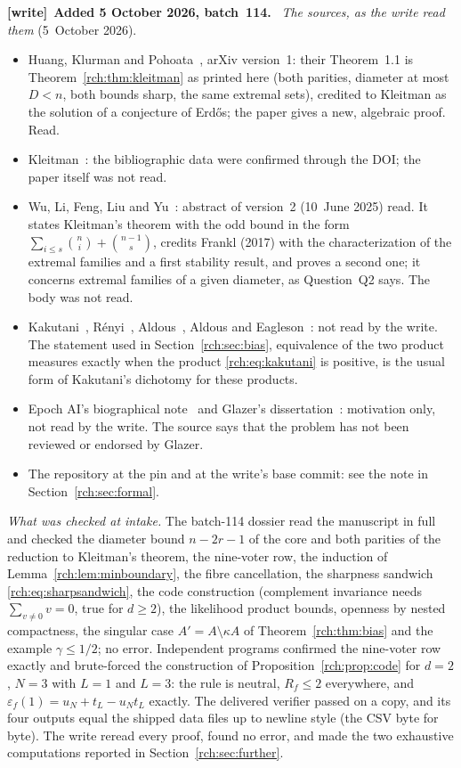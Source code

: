 \documentclass[11pt]{article}
\theoremstyle{definition}
\theoremstyle{remark}
\newcommand{\eps}{\varepsilon}
\newenvironment{writenote}[1][]{\par\smallskip\begingroup\small
 \noindent\textbf{[write]}\if\relax\detokenize{#1}\relax\else~\textbf{#1.}\fi\ }%
 {\par\endgroup\smallskip}
\begin{document}
\begin{writenote}[Added 5 October 2026, batch~114]
\emph{The sources, as the write read them} (5~October 2026).
\begin{itemize}\raggedright
\item Huang, Klurman and Pohoata~\cite{HKP}, arXiv version~1: their
 Theorem~1.1 is Theorem~\ref{rch:thm:kleitman} as printed here (both
 parities, diameter at most $D<n$, both bounds sharp, the same extremal
 sets), credited to Kleitman as the solution of a conjecture of Erd\H{o}s;
 the paper gives a new, algebraic proof. Read.
\item Kleitman~\cite{Kleitman}: the bibliographic data were confirmed through
 the DOI; the paper itself was not read.
\item Wu, Li, Feng, Liu and Yu~\cite{WuEtAl}: abstract of version~2 (10~June
 2025) read. It states Kleitman's theorem with the odd bound in the form
 $\sum_{i\le s}\binom ni+\binom{n-1}s$, credits Frankl (2017) with the
 characterization of the extremal families and a first stability result,
 and proves a second one; it concerns extremal families of a given
 diameter, as Question~Q2 says. The body was not read.
\item Kakutani~\cite{Kakutani}, R\'enyi~\cite{Renyi}, Aldous~\cite{Aldous},
 Aldous and Eagleson~\cite{AldousEagleson}: not read by the write. The
 statement used in Section~\ref{rch:sec:bias}, equivalence of the two
 product measures exactly when the product \eqref{rch:eq:kakutani} is
 positive, is the usual form of Kakutani's dichotomy for these products.
\item Epoch AI's biographical note~\cite{Epoch} and Glazer's
 dissertation~\cite{Glazer}: motivation only, not read by the write. The
 source says that the problem has not been reviewed or endorsed by Glazer.
\item The repository at the pin and at the write's base commit: see the note
 in Section~\ref{rch:sec:formal}.
\end{itemize}

\emph{What was checked at intake.} The batch-114 dossier read the manuscript
in full and checked the diameter bound $n-2r-1$ of the core and both
parities of the reduction to Kleitman's theorem, the nine-voter row, the
induction of Lemma~\ref{rch:lem:minboundary}, the fibre cancellation, the
sharpness sandwich \eqref{rch:eq:sharpsandwich}, the code construction
(complement invariance needs $\sum_{v\ne0}v=0$, true for $d\ge2$), the
likelihood product bounds, openness by nested compactness, the singular
case $A'=A\setminus\kappa A$ of Theorem~\ref{rch:thm:bias} and the example
$\gamma\le1/2$; no error. Independent programs confirmed the nine-voter row
exactly and brute-forced the construction of
Proposition~\ref{rch:prop:code} for $d=2$, $N=3$ with $L=1$ and $L=3$: the
rule is neutral, $R_f\le2$ everywhere, and
$\eps_f(1)=u_N+t_L-u_Nt_L$ exactly. The delivered verifier passed on a
copy, and its four outputs equal the shipped data files up to newline style
(the CSV byte for byte). The write reread every proof, found no error, and
made the two exhaustive computations reported in
Section~\ref{rch:sec:further}.


\end{writenote}
\end{document}
